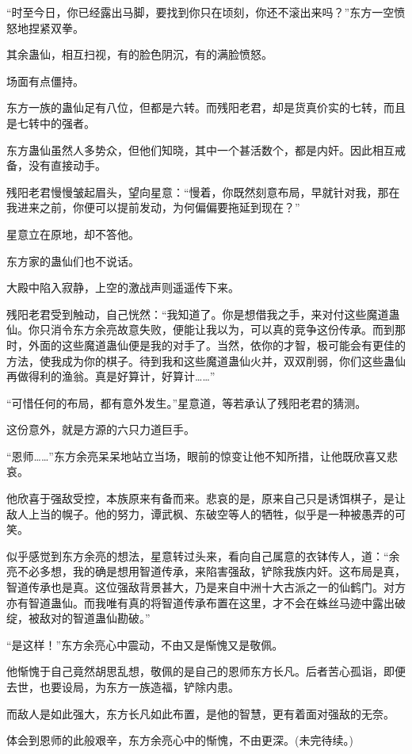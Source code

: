 \begin{this_body}
“时至今日，你已经露出马脚，要找到你只在顷刻，你还不滚出来吗？”东方一空愤怒地捏紧双拳。

其余蛊仙，相互扫视，有的脸色阴沉，有的满脸愤怒。

场面有点僵持。

东方一族的蛊仙足有八位，但都是六转。而残阳老君，却是货真价实的七转，而且是七转中的强者。

东方蛊仙虽然人多势众，但他们知晓，其中一个甚活数个，都是内奸。因此相互戒备，没有直接动手。

残阳老君慢慢皱起眉头，望向星意：“慢着，你既然刻意布局，早就针对我，那在我进来之前，你便可以提前发动，为何偏偏要拖延到现在？”

星意立在原地，却不答他。

东方家的蛊仙们也不说话。

大殿中陷入寂静，上空的激战声则遥遥传下来。

残阳老君受到触动，自己恍然：“我知道了。你是想借我之手，来对付这些魔道蛊仙。你只消令东方余亮故意失败，便能让我以为，可以真的竞争这份传承。而到那时，外面的这些魔道蛊仙便是我的对手了。当然，依你的才智，极可能会有更佳的方法，使我成为你的棋子。待到我和这些魔道蛊仙火并，双双削弱，你们这些蛊仙再做得利的渔翁。真是好算计，好算计……”

“可惜任何的布局，都有意外发生。”星意道，等若承认了残阳老君的猜测。

这份意外，就是方源的六只力道巨手。

“恩师……”东方余亮呆呆地站立当场，眼前的惊变让他不知所措，让他既欣喜又悲哀。

他欣喜于强敌受控，本族原来有备而来。悲哀的是，原来自己只是诱饵棋子，是让敌人上当的幌子。他的努力，谭武枫、东破空等人的牺牲，似乎是一种被愚弄的可笑。

似乎感觉到东方余亮的想法，星意转过头来，看向自己属意的衣钵传人，道：“余亮不必多想，我的确是想用智道传承，来陷害强敌，铲除我族内奸。这布局是真，智道传承也是真。这位强敌背景甚大，乃是来自中洲十大古派之一的仙鹤门。对方亦有智道蛊仙。而我唯有真的将智道传承布置在这里，才不会在蛛丝马迹中露出破绽，被敌对的智道蛊仙勘破。”

“是这样！”东方余亮心中震动，不由又是惭愧又是敬佩。

他惭愧于自己竟然胡思乱想，敬佩的是自己的恩师东方长凡。后者苦心孤诣，即便去世，也要设局，为东方一族造福，铲除内患。

而敌人是如此强大，东方长凡如此布置，是他的智慧，更有着面对强敌的无奈。

体会到恩师的此般艰辛，东方余亮心中的惭愧，不由更深。(未完待续。)

\end{this_body}

